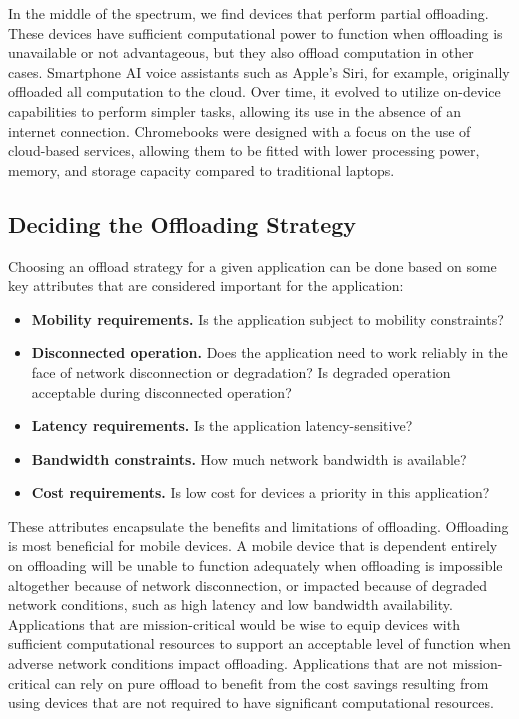 In the middle of the spectrum, we find devices that perform partial offloading.
These devices have sufficient computational power to function when offloading
is unavailable or not advantageous, but they also offload computation in other
cases. Smartphone AI voice assistants such as Apple's Siri, for example,
originally offloaded all computation to the cloud. Over time, it evolved to
utilize on-device capabilities to perform simpler tasks, allowing its use in
the absence of an internet connection.  Chromebooks were designed with a focus
on the use of cloud-based services, allowing them to be fitted with lower
processing power, memory, and storage capacity compared to traditional laptops.

\subsection{Deciding the Offloading Strategy}
\label{sec:deciding-offloading-strategy}

Choosing an offload strategy for a given application can be done based on some
key attributes that are considered important for the application:
\begin{itemize}
    \item \textbf{Mobility requirements.} Is the application subject to
        mobility constraints?
    \item \textbf{Disconnected operation.} Does the application need to work reliably
        in the face of network disconnection or degradation? Is degraded operation
        acceptable during disconnected operation?
    \item \textbf{Latency requirements.} Is the application latency-sensitive?
    \item \textbf{Bandwidth constraints.} How much network bandwidth is
        available?
    \item \textbf{Cost requirements.} Is low cost for devices a priority in
        this application?
\end{itemize}

These attributes encapsulate the benefits and limitations of offloading.
Offloading is most beneficial for mobile devices. A mobile device that
is dependent entirely on offloading will be unable to function adequately when
offloading is impossible altogether because of network disconnection, or
impacted because of degraded network conditions, such as high latency and low
bandwidth availability. Applications that are mission-critical would be wise to
equip devices with sufficient computational resources to support an acceptable
level of function when adverse network conditions impact offloading.
Applications that are not mission-critical can rely on pure offload to benefit
from the cost savings resulting from using devices that are not required to
have significant computational resources.

